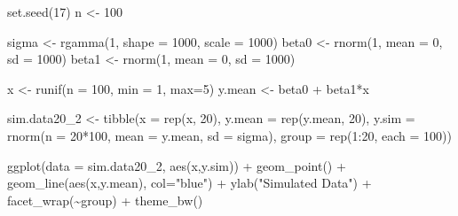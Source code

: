 \documentclass[
]{article}
\newenvironment{Shaded}{\begin{snugshade}}{\end{snugshade}}
\newcommand{\AttributeTok}[1]{\textcolor[rgb]{0.77,0.63,0.00}{#1}}
\newcommand{\DecValTok}[1]{\textcolor[rgb]{0.00,0.00,0.81}{#1}}
\newcommand{\FunctionTok}[1]{\textcolor[rgb]{0.00,0.00,0.00}{#1}}
\newcommand{\NormalTok}[1]{#1}
\newcommand{\OtherTok}[1]{\textcolor[rgb]{0.56,0.35,0.01}{#1}}
\newcommand{\SpecialCharTok}[1]{\textcolor[rgb]{0.00,0.00,0.00}{#1}}
\newcommand{\StringTok}[1]{\textcolor[rgb]{0.31,0.60,0.02}{#1}}
\begin{document}
\begin{Shaded}
\begin{Highlighting}[]
\FunctionTok{set.seed}\NormalTok{(}\DecValTok{17}\NormalTok{)}
\NormalTok{n }\OtherTok{\textless{}{-}} \DecValTok{100}

\NormalTok{sigma }\OtherTok{\textless{}{-}} \FunctionTok{rgamma}\NormalTok{(}\DecValTok{1}\NormalTok{, }\AttributeTok{shape =} \DecValTok{1000}\NormalTok{, }\AttributeTok{scale =} \DecValTok{1000}\NormalTok{)}
\NormalTok{beta0 }\OtherTok{\textless{}{-}} \FunctionTok{rnorm}\NormalTok{(}\DecValTok{1}\NormalTok{, }\AttributeTok{mean =} \DecValTok{0}\NormalTok{, }\AttributeTok{sd =} \DecValTok{1000}\NormalTok{)}
\NormalTok{beta1 }\OtherTok{\textless{}{-}} \FunctionTok{rnorm}\NormalTok{(}\DecValTok{1}\NormalTok{, }\AttributeTok{mean =} \DecValTok{0}\NormalTok{, }\AttributeTok{sd =} \DecValTok{1000}\NormalTok{)}

\NormalTok{x }\OtherTok{\textless{}{-}} \FunctionTok{runif}\NormalTok{(}\AttributeTok{n =} \DecValTok{100}\NormalTok{, }\AttributeTok{min =} \DecValTok{1}\NormalTok{, }\AttributeTok{max=}\DecValTok{5}\NormalTok{)}
\NormalTok{y.mean }\OtherTok{\textless{}{-}}\NormalTok{ beta0 }\SpecialCharTok{+}\NormalTok{ beta1}\SpecialCharTok{*}\NormalTok{x}

\NormalTok{sim.data20\_2 }\OtherTok{\textless{}{-}} \FunctionTok{tibble}\NormalTok{(}\AttributeTok{x =} \FunctionTok{rep}\NormalTok{(x, }\DecValTok{20}\NormalTok{), }
                       \AttributeTok{y.mean =} \FunctionTok{rep}\NormalTok{(y.mean, }\DecValTok{20}\NormalTok{), }
                       \AttributeTok{y.sim =} \FunctionTok{rnorm}\NormalTok{(}\AttributeTok{n =} \DecValTok{20}\SpecialCharTok{*}\DecValTok{100}\NormalTok{, }\AttributeTok{mean =}\NormalTok{ y.mean, }\AttributeTok{sd =}\NormalTok{ sigma), }
                       \AttributeTok{group =} \FunctionTok{rep}\NormalTok{(}\DecValTok{1}\SpecialCharTok{:}\DecValTok{20}\NormalTok{, }\AttributeTok{each =} \DecValTok{100}\NormalTok{))}

\FunctionTok{ggplot}\NormalTok{(}\AttributeTok{data =}\NormalTok{ sim.data20\_2, }\FunctionTok{aes}\NormalTok{(x,y.sim)) }\SpecialCharTok{+} 
  \FunctionTok{geom\_point}\NormalTok{() }\SpecialCharTok{+} 
  \FunctionTok{geom\_line}\NormalTok{(}\FunctionTok{aes}\NormalTok{(x,y.mean), }\AttributeTok{col=}\StringTok{"blue"}\NormalTok{) }\SpecialCharTok{+} 
  \FunctionTok{ylab}\NormalTok{(}\StringTok{"Simulated Data"}\NormalTok{) }\SpecialCharTok{+} 
  \FunctionTok{facet\_wrap}\NormalTok{(}\SpecialCharTok{\textasciitilde{}}\NormalTok{group) }\SpecialCharTok{+}
  \FunctionTok{theme\_bw}\NormalTok{()}
\end{Highlighting}
\end{Shaded}
\end{document}

